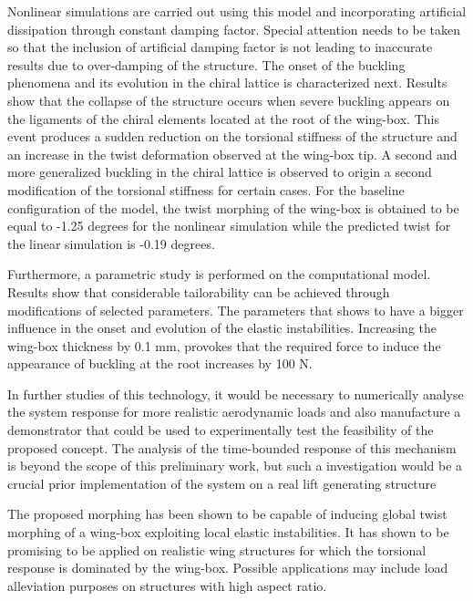 Nonlinear simulations are carried out using this model and incorporating artificial dissipation through constant damping factor. Special attention needs to be taken so that the inclusion of artificial damping factor is not leading to inaccurate results due to over-damping of the structure. The onset of the buckling phenomena and its evolution in the chiral lattice is characterized next. Results show that the collapse of the structure occurs when severe buckling appears on the ligaments of the chiral elements located at the root of the wing-box. This event produces a sudden reduction on the torsional stiffness of the structure and an increase in the twist deformation observed at the wing-box tip. A second and more generalized buckling in the chiral lattice is observed to origin a second modification of the torsional stiffness for certain cases. For the baseline configuration of the model, the twist morphing of the wing-box is obtained to be equal to -1.25 degrees for the nonlinear simulation while the predicted twist for the linear simulation is -0.19 degrees.

Furthermore, a parametric study is performed on the computational model. Results show that considerable tailorability can be achieved through modifications of selected parameters. The parameters that shows to have a bigger influence in the onset and evolution of the elastic instabilities. Increasing the wing-box thickness by 0.1 mm, provokes that the required force to induce the appearance of buckling at the root increases by 100 N. 

In further studies of this technology, it would be necessary to numerically analyse the system response for more realistic aerodynamic loads and also manufacture a demonstrator that could be used to experimentally test the feasibility of the proposed concept. The analysis of the time-bounded response of this mechanism is beyond the scope of this preliminary work, but such a investigation would be a crucial prior implementation of the system on a real lift generating structure

The proposed morphing has been shown to be capable of inducing global twist morphing of a wing-box exploiting local elastic instabilities. It has shown to be promising to be applied on realistic wing structures for which the torsional response is dominated by the wing-box. Possible applications may include load alleviation purposes on structures with high aspect ratio. 